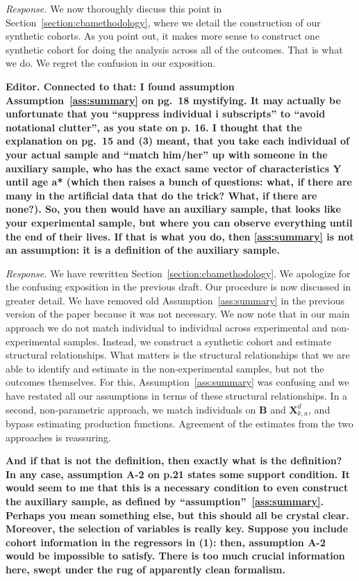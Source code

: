 \noindent \textit{Response.} We now thoroughly discuss this point in Section~\ref{section:cbamethodology}, where we detail the construction of our synthetic cohorts. As you point out, it makes more sense to construct one synthetic cohort for doing the analysis across all of the outcomes. That is what we do. We regret the confusion in our exposition.

\noindent \textbf{Editor. Connected to that: I found assumption Assumption~\ref{ass:summary} on pg.\ 18 mystifying. It may actually be unfortunate that you ``suppress individual i subscripts'' to ``avoid notational clutter'', as you state on p. 16. I thought that the explanation on pg.\ 15 and (3) meant, that you take each individual of your actual sample and ``match him/her'' up with someone in the auxiliary sample, who has the exact same vector of characteristics Y until age a* (which then raises a bunch of questions: what, if there are many in the artificial data that do the trick? What, if there are none?). So, you then would have an auxiliary sample, that looks like your experimental sample, but where you can observe everything until the end of their lives. If that is what you do, then \ref{ass:summary} is not an assumption: it is a definition of the auxiliary sample.}

\noindent \textit{Response.} We have rewritten Section~\ref{section:cbamethodology}. We apologize for the confusing exposition in the previous draft. Our procedure is now discussed in greater detail. We have removed old Assumption~\ref{ass:summary} in the previous version of the paper because it was not necessary. We now note that in our main approach we do not match individual to individual across experimental and non-experimental samples. Instead, we construct a synthetic cohort and estimate structural relationships. What matters is the structural relationships that we are able to identify and estimate in the non-experimental samples, but not the outcomes themselves. For this, Assumption~\ref{ass:summary} was confusing and we have restated all our assumptions in terms of these structural relationships. In a second, non-parametric approach, we match individuals on $\bm{B}$ and $\bm{X}^d_{k,a}$, and bypass estimating production functions. Agreement of the estimates from  the two approaches is reassuring.

\noindent \textbf{And if that is not the definition, then exactly what is the definition? In any case, assumption A-2 on p.21 states some support condition. It would seem to me that this is a necessary condition to even construct the auxiliary sample, as defined by ``assumption''~\ref{ass:summary}. Perhaps you mean something else, but this should all be crystal clear. Moreover, the selection of variables is really key. Suppose you include cohort information in the regressors in (1): then, assumption A-2 would be impossible to satisfy. There is too much crucial information here, swept under the rug of apparently clean formalism.}

